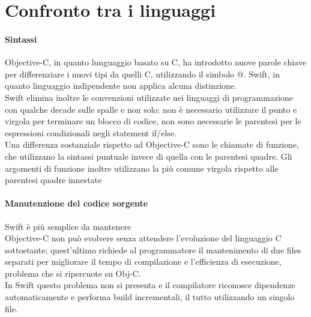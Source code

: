 \chapter{Confronto tra i linguaggi}
\subsubsection{Sintassi}
Objective-C, in quanto lunguaggio basato su C, ha introdotto nuove parole chiave per differenziare i nuovi tipi da quelli C, utilizzando il simbolo @. Swift, in quanto linguaggio indipendente non applica alcuna distinzione.\\
Swift elimina inoltre le convenzioni utilizzate nei linguaggi di programmazione con qualche decade sulle spalle e non solo: non è necessario utilizzare il punto e virgola per terminare un blocco di codice, non sono necessarie le parentesi per le espressioni condizionali negli statement if/else.\\
Una differenza sostanziale rispetto ad Objective-C sono le chiamate di funzione, che utilizzano la sintassi puntuale invece di quella con le parentesi quadre. Gli argomenti di funzione inoltre utilizzano la più comune virgola rispetto alle parentesi quadre innestate
\subsubsection{Manutenzione del codice sorgente}
Swift è più semplice da mantenere\\
Objective-C non può evolvere senza attendere l'evoluzione del linguaggio C sottostante; quest'ultimo richiede al programmatore il mantenimento di due files separati per migliorare il tempo di compilazione e l'efficienza di esecuzione, problema che si ripercuote su Obj-C.\\
In Swift questo problema non si presenta e il compilatore riconosce dipendenze automaticamente e performa build incrementali, il tutto utilizzando un singolo file.
